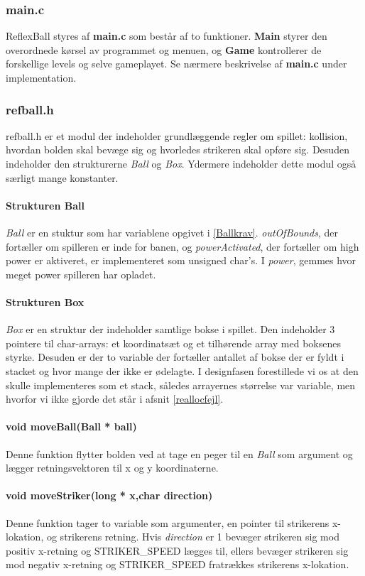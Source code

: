 \subsubsection{main.c}
ReflexBall styres af \textbf{main.c} som består af to funktioner. \textbf{Main} styrer den overordnede kørsel av programmet og menuen, og \textbf{Game} kontrollerer de forskellige levels og selve gameplayet. Se nærmere beskrivelse af \textbf{main.c} under implementation.

\subsubsection{refball.h}
refball.h er et modul der indeholder grundlæggende regler om spillet: kollision, hvordan bolden skal bevæge sig og hvorledes strikeren skal opføre sig. Desuden indeholder den strukturerne \textit{Ball} og \textit{Box}. Ydermere indeholder dette modul også særligt mange konstanter.
\paragraph{Strukturen Ball}
\textit{Ball} er en stuktur som har variablene opgivet i \ref{Ballkrav}. \textit{outOfBounds}, der fortæller om spilleren er inde for banen, og \textit{powerActivated}, der fortæller om high power er aktiveret, er implementeret som unsigned char's. I \textit{power}, gemmes hvor meget power spilleren har opladet.
 

\paragraph{Strukturen Box}
\textit{Box} er en struktur der indeholder samtlige bokse i spillet. Den indeholder 3 pointere til char-arrays: et koordinatsæt og et tilhørende array med boksenes styrke. Desuden er der to variable der fortæller antallet af bokse der er fyldt i stacket og hvor mange der ikke er ødelagte. I designfasen forestillede vi os at den skulle implementeres som et stack, således arrayernes størrelse var variable, men hvorfor vi ikke gjorde det står i afsnit \ref{reallocfejl}.
\paragraph{void moveBall(Ball * ball)}
Denne funktion flytter bolden ved at tage en peger til en \textit{Ball} som argument og lægger retningsvektoren til x og y koordinaterne.
\paragraph{void moveStriker(long * x,char direction)}
Denne funktion tager to variable som argumenter, en pointer til strikerens x-lokation, og  strikerens retning. Hvis \textit{direction} er 1 bevæger strikeren sig mod positiv x-retning og STRIKER\_SPEED lægges til, ellers bevæger strikeren sig mod negativ x-retning og STRIKER\_SPEED fratrækkes strikerens x-lokation.
